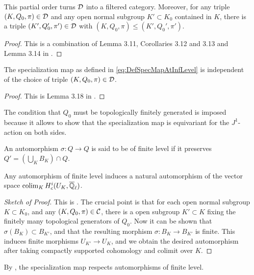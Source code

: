 \documentclass[../main.tex]{subfiles}
\begin{document}
\begin{lem}\label{lem:MiedaCategoryOfChoicesIsFiltered}
  This partial order turns $\mathcal{D}$ into a filtered category. Moreover, for any
  triple $(K, Q_0, \pi) \in \mathcal{D}$ and any open normal subgroup $K' \subset K_0$ 
  contained in $K$, there is a triple $(K', Q_0', \pi') \in \mathcal{D}$ with $(K, Q_0,
  \pi) \leq (K', Q_0', \pi')$. 
\begin{proof}
  This is a combination of Lemma 3.11, Corollaries 3.12 and 3.13 and 
  Lemma 3.14 in \cite{mieda2016geometric}.
\end{proof}
\end{lem}

\begin{lem}\label{lem:specmapisindependentofchoice}
  The specialization map as defined in \eqref{eq:DefSpecMapAtInfLevel} is
  independent of the choice of triple $(K, Q_0, \pi) \in \mathcal{D}$. 
  \begin{proof}
    This is Lemma 3.18 in \cite{mieda2016geometric}.
  \end{proof}
\end{lem}

The condition that $Q_0$ must be topologically finitely generated is imposed 
because it allows to show that the specialization map is equivariant for the 
$J^1$-action on both sides. 

\begin{defi}\label{def:MorphismOfFinLevel}
  An automorphism $\sigma\colon Q \to Q$ is said to be of finite level if it 
  preserves $Q' = (\bigcup_K B_K)\cap Q$. 
\end{defi}

\begin{lem}\label{lem:FinLevelAutoYIeldAutOfColim}
  Any automorphism of finite level
  induces a natural automorphism of the vector space $\operatorname*{colim}_K H^i_c(U_K, {\overline {\mathbb{Q}}_\ell})$.
  \begin{proof}[Sketch of Proof] 
    This is \cite[Lemma 3.20]{mieda2016geometric}.  The crucial point 
    is that for each open normal subgroup $K \subset K_0$, and any 
    $(K, Q_0, \pi) \in \mathcal{C}$, there is a open subgroup $K' \subset K$ fixing the 
    finitely many topological generators of $Q_0$. Now it can be shown that 
    $\sigma(B_K) \subset B_{K'}$, and that the resulting morphism
    $\sigma\colon B_K \to B_{K'}$ is finite. This induces finite morphisms
    $U_{K'} \to U_K$, and we obtain the desired automorphism after taking 
    compactly supported cohomology and colimit over $K$. 
\end{proof}
\end{lem}
By \cite[Proposition 3.21]{mieda2016geometric}, the specialization map respects
automorphisms of finite level.
\end{document}

